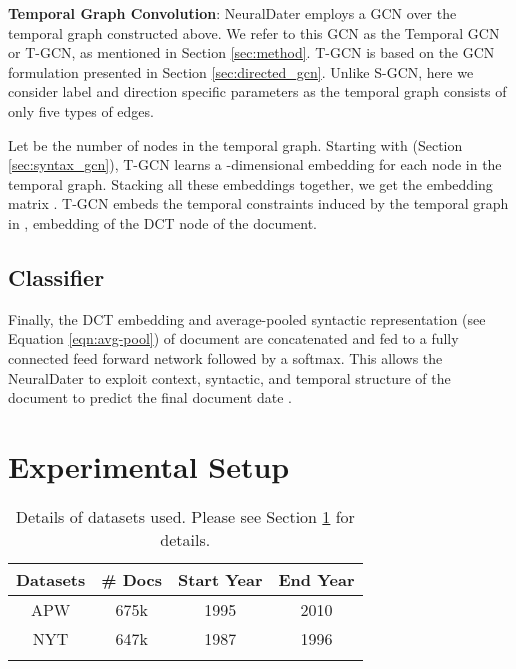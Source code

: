 \documentclass[11pt,a4paper]{article}
\newcommand{\refeqn}[1]{Equation \ref{#1}}
\newcommand{\refsec}[1]{Section \ref{#1}}
\newcommand{\method}{NeuralDater}
\begin{document}
\textbf{Temporal Graph Convolution}: \method{} employs a GCN over the temporal graph constructed above. We refer to this GCN as the Temporal GCN or T-GCN, as mentioned in \refsec{sec:method}. T-GCN is based on the GCN formulation presented in \refsec{sec:directed_gcn}. Unlike S-GCN, here we consider label and direction specific parameters as the temporal graph consists of only five types of edges.

Let  be the number of nodes in the temporal graph. Starting with  (\refsec{sec:syntax_gcn}), T-GCN learns a -dimensional embedding for each node in the temporal graph. Stacking all these embeddings together, we get the embedding matrix . T-GCN embeds the temporal constraints induced by the temporal graph in , embedding of the DCT node of the document. 




\subsection{Classifier}
Finally, the DCT embedding  and average-pooled syntactic representation  (see \refeqn{eqn:avg-pool}) of document  are concatenated and fed to a fully connected feed forward network followed by a softmax. This allows the \method{} to exploit context, syntactic, and temporal structure of the document to  predict the final document date .





















 \section{Experimental Setup}
\label{sec:experiments}

\begin{table}[t]
	\begin{tabular}{cccc}
		\toprule
		Datasets 	& \# Docs & Start Year & End Year\\
		\midrule
		APW 		&  675k	& 1995  & 2010 \\
		NYT			&  647k	& 1987  & 1996 \\
		\bottomrule
		\addlinespace
	\end{tabular}
	\caption{\label{tb:datasets}Details of datasets used. Please see \refsec{sec:experiments} for details.}
\end{table}
\end{document}
